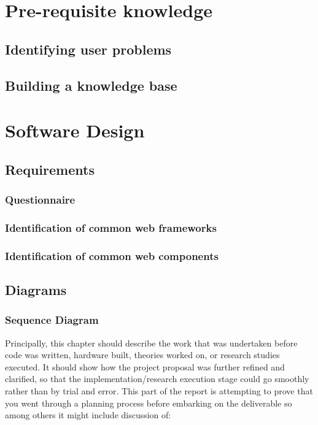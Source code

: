 \section{Pre-requisite knowledge}
\subsection{Identifying user problems}

\subsection{Building a knowledge base}

\section{Software Design}
\subsection{Requirements}
\subsubsection{Questionnaire}

\subsubsection{Identification of common web frameworks}
\subsubsection{Identification of common web components}
\subsection{Diagrams}
\subsubsection{Sequence Diagram}


Principally, this chapter should describe the work that was undertaken before
code was written, hardware built, theories worked on, or research studies
executed. It should show how the project proposal was further refined and
clarified, so that the implementation/research execution stage could go
smoothly rather than by trial and error. This part of the report is attempting to
prove that you went through a planning process before embarking on the
deliverable so among others it might include discussion of:

